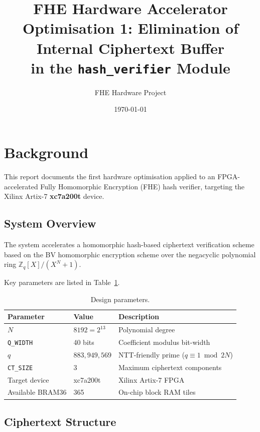 \documentclass[12pt, a4paper]{article}
\title{
  \textbf{FHE Hardware Accelerator}\\[0.4em]
  \large Optimisation 1: Elimination of Internal Ciphertext Buffer\\
  in the \texttt{hash\_verifier} Module
}
\author{FHE Hardware Project}
\date{\today}
\begin{document}
\maketitle
\tableofcontents
\newpage

\section{Background}
\label{sec:background}

This report documents the first hardware optimisation applied to an
FPGA-accelerated Fully Homomorphic Encryption (FHE) hash verifier,
targeting the Xilinx Artix-7 \textbf{xc7a200t} device.

\subsection{System Overview}

The system accelerates a homomorphic hash-based ciphertext verification
scheme based on the BV homomorphic encryption scheme over the
negacyclic polynomial ring $\mathbb{Z}_q[X]/(X^N+1)$.

Key parameters are listed in Table~\ref{tab:params}.

\begin{table}[h]
\centering
\begin{tabular}{lll}
\toprule
\textbf{Parameter} & \textbf{Value} & \textbf{Description} \\
\midrule
$N$ & $8192 = 2^{13}$ & Polynomial degree \\
\texttt{Q\_WIDTH} & 40 bits & Coefficient modulus bit-width \\
$q$ & $883{,}949{,}569$ & NTT-friendly prime ($q \equiv 1 \bmod 2N$) \\
\texttt{CT\_SIZE} & 3 & Maximum ciphertext components \\
Target device & xc7a200t & Xilinx Artix-7 FPGA \\
Available BRAM36 & 365 & On-chip block RAM tiles \\
\bottomrule
\end{tabular}
\caption{Design parameters.}
\label{tab:params}
\end{table}

\subsection{Ciphertext Structure}
\end{document}

